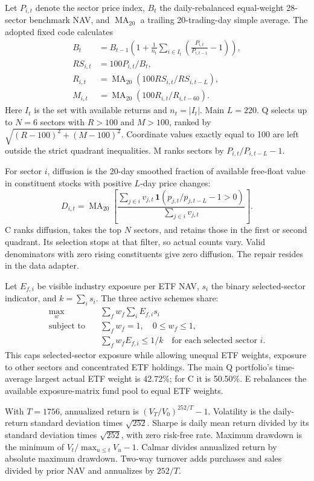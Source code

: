 Let $P_{i,t}$ denote the sector price index, $B_t$ the daily-rebalanced equal-weight 28-sector benchmark NAV, and $\operatorname{MA}_{20}$ a trailing 20-trading-day simple average. The adopted fixed code calculates
\begin{align*}
B_t&=B_{t-1}\left(1+\frac{1}{n_t}\sum_{i\in I_t}\left(\frac{P_{i,t}}{P_{i,t-1}}-1\right)\right),\\
RS_{i,t}&=100P_{i,t}/B_t,\\
R_{i,t}&=\operatorname{MA}_{20}\left(100RS_{i,t}/RS_{i,t-L}\right),\\
M_{i,t}&=\operatorname{MA}_{20}\left(100R_{i,t}/R_{i,t-60}\right).
\end{align*}
Here $I_t$ is the set with available returns and $n_t=|I_t|$. Main $L=220$. Q selects up to $N=6$ sectors with $R>100$ and $M>100$, ranked by $\sqrt{(R-100)^2+(M-100)^2}$. Coordinate values exactly equal to 100 are left outside the strict quadrant inequalities. M ranks sectors by $P_{i,t}/P_{i,t-L}-1$.

For sector $i$, diffusion is the 20-day smoothed fraction of available free-float value in constituent stocks with positive $L$-day price changes:
\[
D_{i,t}=\operatorname{MA}_{20}\left[\frac{\sum_{j\in i}v_{j,t}\,\mathbf{1}(p_{j,t}/p_{j,t-L}-1>0)}{\sum_{j\in i}v_{j,t}}\right].
\]
C ranks diffusion, takes the top $N$ sectors, and retains those in the first or second quadrant. Its selection stops at that filter, so actual counts vary. Valid denominators with zero rising constituents give zero diffusion. The repair resides in the data adapter.

Let $E_{f,i}$ be visible industry exposure per ETF NAV, $s_i$ the binary selected-sector indicator, and $k=\sum_i s_i$. The three active schemes share:
\begin{align*}
\max_{w}\quad &\sum_f w_f\sum_i E_{f,i}s_i\\
\text{subject to}\quad &\sum_f w_f=1,\quad 0\leq w_f\leq1,\\
&\sum_f w_fE_{f,i}\leq1/k\quad\text{for each selected sector }i.
\end{align*}
This caps selected-sector exposure while allowing unequal ETF weights, exposure to other sectors and concentrated ETF holdings. The main Q portfolio's time-average largest actual ETF weight is 42.72\%; for C it is 50.50\%. E rebalances the available exposure-matrix fund pool to equal ETF weights.

With $T=1756$, annualized return is $(V_T/V_0)^{252/T}-1$. Volatility is the daily-return standard deviation times $\sqrt{252}$. Sharpe is daily mean return divided by its standard deviation times $\sqrt{252}$, with zero risk-free rate. Maximum drawdown is the minimum of $V_t/\max_{u\leq t}V_u-1$. Calmar divides annualized return by absolute maximum drawdown. Two-way turnover adds purchases and sales divided by prior NAV and annualizes by $252/T$.

